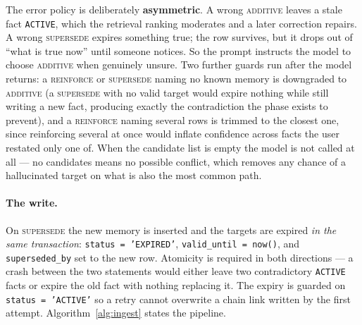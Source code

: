 \documentclass[11pt,a4paper]{article}
\begin{document}
The error policy is deliberately \textbf{asymmetric}. A wrong \textsc{additive}
leaves a stale fact \texttt{ACTIVE}, which the retrieval ranking moderates and a
later correction repairs. A wrong \textsc{supersede} expires something true; the
row survives, but it drops out of ``what is true now'' until someone notices. So
the prompt instructs the model to choose \textsc{additive} when genuinely
unsure. Two further guards run after the model returns: a \textsc{reinforce} or
\textsc{supersede} naming no known memory is downgraded to \textsc{additive}
(a \textsc{supersede} with no valid target would expire nothing while still
writing a new fact, producing exactly the contradiction the phase exists to
prevent), and a \textsc{reinforce} naming several rows is trimmed to the closest
one, since reinforcing several at once would inflate confidence across facts the
user restated only one of. When the candidate list is empty the model is not
called at all --- no candidates means no possible conflict, which removes any
chance of a hallucinated target on what is also the most common path.

\paragraph{The write.} On \textsc{supersede} the new memory is inserted and the
targets are expired \emph{in the same transaction}: \texttt{status =
'EXPIRED'}, \texttt{valid\_until = now()}, and \texttt{superseded\_by} set to
the new row. Atomicity is required in both directions --- a crash between the
two statements would either leave two contradictory \texttt{ACTIVE} facts or
expire the old fact with nothing replacing it. The expiry is guarded on
\texttt{status = 'ACTIVE'} so a retry cannot overwrite a chain link written by
the first attempt. Algorithm~\ref{alg:ingest} states the pipeline.
\end{document}
